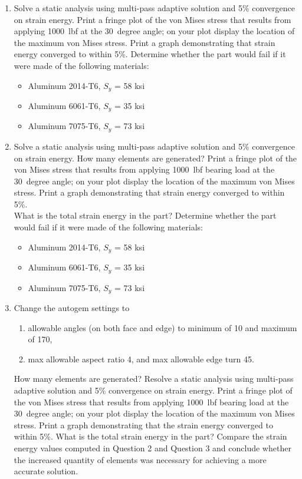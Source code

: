 \documentclass[12pt]{article}
\begin{document}
\begin{enumerate}
	\item Solve a static analysis using multi-pass adaptive solution and 5\% convergence on strain energy. Print a fringe plot of the von Mises stress that results from applying 1000~lbf at the 30~degree angle; on your plot display the location of the maximum von Mises stress. Print a graph demonstrating that strain energy converged to within 5\%. Determine whether the part would fail if it were made of the following materials:
	\begin{itemize}
		\item Aluminum 2014-T6, $S_y$ = 58 ksi
		\item Aluminum 6061-T6, $S_y$ = 35 ksi
		\item Aluminum 7075-T6, $S_y$ = 73 ksi
	\end{itemize}
	
	\vspace{.25in}
	
	\item Solve a static analysis using multi-pass adaptive solution and 5\% convergence on strain energy. How many elements are generated? Print a fringe plot of the von Mises stress that results from applying 1000~lbf bearing load at the 30~degree angle; on your plot display the location of the maximum von Mises stress. Print a graph demonstrating that strain energy converged to within 5\%.\\
What is the total strain energy in the part? Determine whether the part would fail if it were made of the following materials:
	\begin{itemize}
		\item Aluminum 2014-T6, $S_y$ = 58 ksi
		\item Aluminum 6061-T6, $S_y$ = 35 ksi
		\item Aluminum 7075-T6, $S_y$ = 73 ksi
	\end{itemize}
	
	\vspace{.25in}

	\item Change the autogem settings to
		\begin{enumerate}
			\item allowable angles (on both face and edge) to minimum of 10 and maximum of 170,
			\item max allowable aspect ratio 4, and max allowable edge turn 45.
		\end{enumerate}
How many elements are generated? Resolve a static analysis using multi-pass adaptive solution and 5\% convergence on strain energy. Print a fringe plot of the von Mises stress that results from applying 1000~lbf bearing load at the 30~degree angle; on your plot display the location of the maximum von Mises stress. Print a graph demonstrating that the strain energy converged to within 5\%.
What is the total strain energy in the part? Compare the strain energy values computed in Question 2 and Question 3 and conclude whether the increased quantity of elements was necessary for achieving a more accurate solution.


\end{enumerate}
\end{document}
